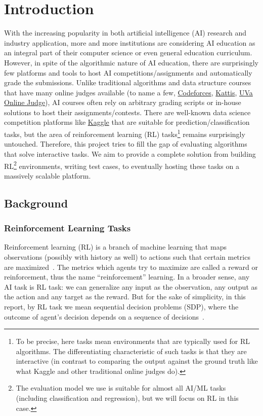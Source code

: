 \chapter{Introduction}

With the increasing popularity in both artificial intelligence (AI) research and industry application, more and more institutions are considering AI education as an integral part of their computer science or even general education curriculum. However, in spite of the algorithmic nature of AI education, there are surprisingly few platforms and tools to host AI competitions/assignments and automatically grade the submissions. Unlike traditional algorithms and data structure courses that have many online judges available (to name a few, \href{https://codeforces.com/}{Codeforces}, \href{https://open.kattis.com/}{Kattis}, \href{https://onlinejudge.org/}{UVa Online Judge}), AI courses often rely on arbitrary grading scripts or in-house solutions to host their assignments/contests. There are well-known data science competition platforms like \href{https://www.kaggle.com/}{Kaggle} that are suitable for prediction/classification tasks, but the area of reinforcement learning (RL) tasks\footnote{To be precise, here tasks mean environments that are typically used for RL algorithms. The differentiating characteristic of such tasks is that they are interactive (in contrast to comparing the output against the ground truth like what Kaggle and other traditional online judges do).} remains surprisingly untouched. Therefore, this project tries to fill the gap of evaluating algorithms that solve interactive tasks. We aim to provide a complete solution from building RL\footnote{The evaluation model we use is suitable for almost all AI/ML tasks (including classification and regression), but we will focus on RL in this case.} environments, writing test cases, to eventually hosting these tasks on a massively scalable platform.

\section{Background}
\subsection{Reinforcement Learning Tasks}
Reinforcement learning (RL) is a branch of machine learning that maps observations (possibly with history as well) to actions such that certain metrics are maximized~\parencite{sutton-barto}. The metrics which agents try to maximize are called a reward or reinforcement, thus the name “reinforcement” learning. In a broader sense, any AI task is RL task: we can generalize any input as the observation, any output as the action and any target as the reward. But for the sake of simplicity, in this report, by RL task we mean sequential decision problems (SDP), where the outcome of agent’s decision depends on a sequence of decisions~\parencite{russell}.

